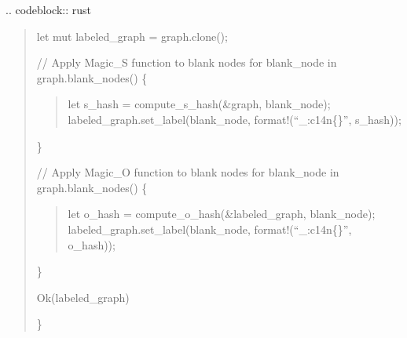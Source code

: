\documentclass[letterpaper,10pt,english]{sphinxmanual}
\begin{document}
\sphinxAtStartPar
{}
.. code\sphinxhyphen{}block:: rust
\begin{quote}
\begin{description}
\sphinxAtStartPar
let mut labeled\_graph = graph.clone();

\sphinxAtStartPar
// Apply Magic\_S function to blank nodes
for blank\_node in graph.blank\_nodes() \{
\begin{quote}

\sphinxAtStartPar
let s\_hash = compute\_s\_hash(\&graph, blank\_node);
labeled\_graph.set\_label(blank\_node, format!(“\_:c14n\{\}”, s\_hash));
\end{quote}

\sphinxAtStartPar
\}

\sphinxAtStartPar
// Apply Magic\_O function to blank nodes
for blank\_node in graph.blank\_nodes() \{
\begin{quote}

\sphinxAtStartPar
let o\_hash = compute\_o\_hash(\&labeled\_graph, blank\_node);
labeled\_graph.set\_label(blank\_node, format!(“\_:c14n\{\}”, o\_hash));
\end{quote}

\sphinxAtStartPar
\}

\sphinxAtStartPar
Ok(labeled\_graph)

\end{description}

\sphinxAtStartPar
\}
\end{quote}
\end{document}
